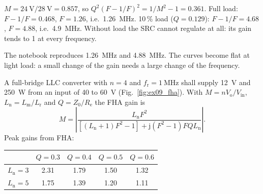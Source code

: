 \begin{solutionblock}
	$M=\SI{24}{\volt}/\SI{28}{\volt}=0.857$, so $Q^2(F-1/F)^2=1/M^2-1=0.361$. Full load: $F-1/F=0.468$, $F=1.26$, i.e.\ \SI{1.26}{\mega\hertz}. 10\,\% load ($Q=0.129$): $F-1/F=4.68$, $F=4.88$, i.e.\ \SI{4.9}{\mega\hertz}. Without load the SRC cannot regulate at all: its gain tends to 1 at every frequency.
\end{solutionblock}


\begin{solutionblock}
	The notebook reproduces \SI{1.26}{\mega\hertz} and \SI{4.88}{\mega\hertz}. The curves become flat at light load: a small change of the gain needs a large change of the frequency.
\end{solutionblock}



A full-bridge LLC converter with $n=4$ and $f_\mathrm{r}=\SI{1}{\mega\hertz}$ shall supply \SI{12}{\volt} and \SI{250}{\watt} from an input of 40 to \SI{60}{\volt} (Fig.~\ref{fig:ex09_fha}). With $M=nV_\mathrm{o}/V_\mathrm{in}$, $L_\mathrm{n}=L_\mathrm{m}/L_\mathrm{r}$ and $Q=Z_0/R_\mathrm{e}$ the FHA gain is
\begin{equation}
	M=\left|\frac{L_\mathrm{n}F^2}{\left[(L_\mathrm{n}+1)F^2-1\right]+\mathrm{j}\left(F^2-1\right)FQL_\mathrm{n}}\right|.
\end{equation}
Peak gains from FHA:

\begin{center}
	\begin{tabular}{|l|c|c|c|c|}
		\hline
		                        & $Q=0.3$ & $Q=0.4$ & $Q=0.5$ & $Q=0.6$ \\
		\hline
		$L_\mathrm{n}=3$        & 2.31    & 1.79    & 1.50    & 1.32    \\
		$L_\mathrm{n}=5$        & 1.75    & 1.39    & 1.20    & 1.11    \\
		\hline
	\end{tabular}
	\label{tab:ex09_peak}
\end{center}




